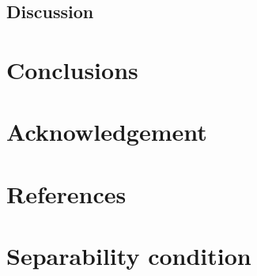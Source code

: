 \documentclass[]{elsarticle}
\theoremstyle{definition}
\begin{document}
\subsection{Discussion}




\section{Conclusions}\label{conclusions}
  


     
\section*{Acknowledgement}

          
\section*{References}







\appendix
\section{Separability condition}\label{sepcondition}
\end{document}
